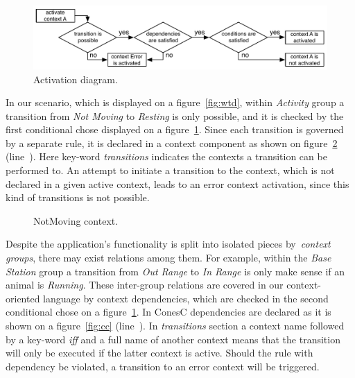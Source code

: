 \begin{figure}[!h]
\centering
\includegraphics[width=\columnwidth]{pdf/activation_diagram}
\caption{Activation diagram.}
\label{fig:ad}
\end{figure}

In our scenario, which is displayed on a figure~\ref{fig:wtd}, within \emph{Activity} group a
transition from \emph{Not Moving} to \emph{Resting} is only possible, and it is checked
by the first conditional chose displayed on a figure~\ref{fig:ad}.
Since each transition is governed by a separate rule, it is declared in a context component as shown
on figure~\ref{fig:nmc} (line~). Here key-word \emph{transitions} indicates the
contexts a transition can be performed to. An attempt to initiate
a transition to the context, which is not declared in a given active context, leads to an error context
activation, since this kind of transitions is not possible.


\begin{figure}[!h]
\TheSbox
\caption{NotMoving context.}
\label{fig:nmc}
\end{figure}

Despite the application's  functionality is split into isolated pieces by~\emph{context groups},
there may exist relations among them. For example, within the 
\emph{Base Station} group a transition from \emph{Out Range} to \emph{In Range} is only
make sense if an animal is \emph{Running}. These inter-group relations are covered in our
context-oriented language by context dependencies, which are checked in the second
conditional chose on a figure~\ref{fig:ad}. In ConesC dependencies are declared as it is shown on a
figure~\ref{fig:cc} (line~). In \emph{transitions} section a context name
followed by a key-word \emph{iff} and a full name of another context means that
the transition will only be executed if the latter context is active. Should the rule with dependency
be violated, a transition to an error context will be triggered.

